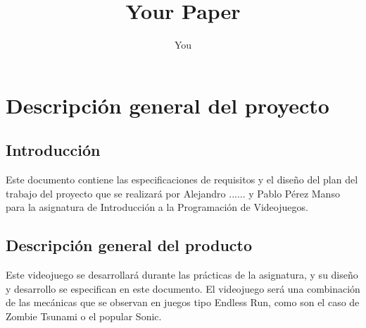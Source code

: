\documentclass[a4paper]{article}
\title{Your Paper}
\author{You}
\begin{document}
\section{Descripción general del proyecto}
\subsection{Introducción}
Este documento contiene las especificaciones de requisitos y el diseño del plan del trabajo del proyecto que se realizará por Alejandro ...... y Pablo Pérez Manso para la asignatura de Introducción a la Programación de Videojuegos.
\subsection{Descripción general del producto}
Este videojuego se desarrollará durante las prácticas de la asignatura, y su diseño y desarrollo se especifican en este documento. El videojuego será una combinación de las mecánicas que se observan en juegos tipo Endless Run, como son el caso de Zombie Tsunami o el popular Sonic.
\end{document}
